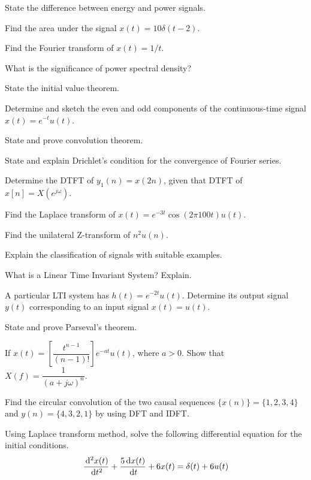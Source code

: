 \newpage

\sub{\subj}

\maxtime
\partA

\iitem State the difference between energy and power signals.
\item Find the area under the signal $x(t) = 10\delta(t - 2)$.
\item Find the Fourier transform of $x(t) = 1/t.$
\item What is the significance of power spectral density?
\item State the initial value theorem.

\markA
\partB

\item Determine and sketch the even and odd components of the continuous-time
  signal $x(t) = e^{-t} u(t)$.
\item State and prove convolution theorem.
\item State and explain Drichlet's condition for the convergence of Fourier series.
\item Determine the DTFT of $y_1(n) = x(2n)$, given that DTFT of $x[n] = X (e^{j\omega})$.
\item Find the Laplace transform of $x(t) = e^{-3t} \cos (2\pi 100 t) u(t)$.
\item Find the unilateral Z-transform of $n^2 u(n)$.

\markB
\partCo

\item \iitem Explain the classification of signals with suitable examples.
\Or

\newpage \again

\item \iitem What is a Linear Time Invariant System? Explain.
\item A particular LTI system has $h(t) = e^{-2t} u(t)$. Determine its output 
  signal $y(t)$ corresponding to an input signal $x(t) = u(t)$.
\ene \ene

\item \iitem State and prove Parseval's theorem.
\Or
\item If $x(t) = \left[ \dfrac{t^{n - 1}}{(n-1)!}\right] e^{-at} u(t)$, where $a > 0$.
  Show that $X(f) = \dfrac{1}{(a + j\omega)^n}.$
\ene

\item \iitem Find the circular convolution of the two causal sequences $\{x(n)\} =
  \{1, 2, 3, 4\}$ and $y(n) = \{4, 3, 2, 1\}$ by using DFT and IDFT.
\Or
\item Using Laplace transform method, solve the following differential equation for 
  the initial conditions.
\[ \dfrac{\,\mathrm{d}^2 x(t)}{\,\mathrm{d} t^2} + \dfrac{5\,\mathrm{d} x(t)}{\,\mathrm{d} t} + 6x(t) = \delta(t) + 6u(t)\]


